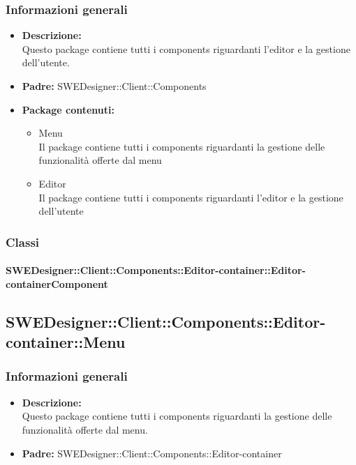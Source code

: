 		\subsubsection{Informazioni generali}
			\begin{itemize}
          		\item \textbf{Descrizione:}\\
          		Questo package contiene tutti i components riguardanti l'editor e la gestione dell'utente.
          		\item \textbf{Padre:} SWEDesigner::Client::Components
          		\item \textbf{Package contenuti:}\\
          		\begin{itemize}
          			\item Menu\\
          			Il package contiene tutti i components riguardanti la gestione delle funzionalità offerte dal menu
          			\item Editor\\
          			Il package contiene tutti i components riguardanti l'editor e la gestione dell'utente
          		\end{itemize}
          	\end{itemize}
          	
		\subsubsection{Classi}
		
			\paragraph{SWEDesigner::Client::Components::Editor-container::Editor-containerComponent}
				
				
	\subsection{SWEDesigner::Client::Components::Editor-container::Menu}
		\subsubsection{Informazioni generali}
			\begin{itemize}
          		\item \textbf{Descrizione:}\\
          		Questo package contiene tutti i components riguardanti la gestione delle funzionalità offerte dal menu.
          		\item \textbf{Padre:} SWEDesigner::Client::Components::Editor-container
          	\end{itemize}
          	
